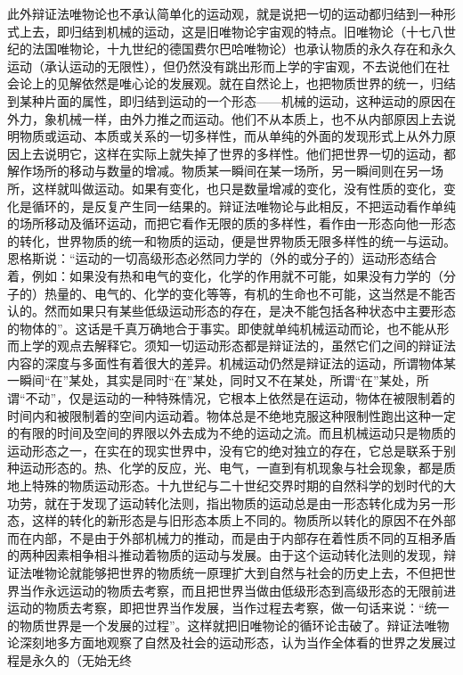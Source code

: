 此外辩证法唯物论也不承认简单化的运动观，就是说把一切的运动都归结到一种形式上去，即归结到机械的运动，这是旧唯物论宇宙观的特点。旧唯物论（十七八世纪的法国唯物论，十九世纪的德国费尔巴哈唯物论）也承认物质的永久存在和永久运动（承认运动的无限性），但仍然没有跳出形而上学的宇宙观，不去说他们在社会论上的见解依然是唯心论的发展观。就在自然论上，也把物质世界的统一，归结到某种片面的属性，即归结到运动的一个形态——机械的运动，这种运动的原因在外力，象机械一样，由外力推之而运动。他们不从本质上，也不从内部原因上去说明物质或运动、本质或关系的一切多样性，而从单纯的外面的发现形式上从外力原因上去说明它，这样在实际上就失掉了世界的多样性。他们把世界一切的运动，都解作场所的移动与数量的增减。物质某一瞬间在某一场所，另一瞬间则在另一场所，这样就叫做运动。如果有变化，也只是数量增减的变化，没有性质的变化，变化是循环的，是反复产生同一结果的。辩证法唯物论与此相反，不把运动看作单纯的场所移动及循环运动，而把它看作无限的质的多样性，看作由一形态向他一形态的转化，世界物质的统一和物质的运动，便是世界物质无限多样性的统一与运动。恩格斯说：“运动的一切高级形态必然同力学的（外的或分子的）运动形态结合着，例如：如果没有热和电气的变化，化学的作用就不可能，如果没有力学的（分子的）热量的、电气的、化学的变化等等，有机的生命也不可能，这当然是不能否认的。然而如果只有某些低级运动形态的存在，是决不能包括各种状态中主要形态的物体的”。这话是千真万确地合于事实。即使就单纯机械运动而论，也不能从形而上学的观点去解释它。须知一切运动形态都是辩证法的，虽然它们之间的辩证法内容的深度与多面性有着很大的差异。机械运动仍然是辩证法的运动，所谓物体某一瞬间“在”某处，其实是同时“在”某处，同时又不在某处，所谓“在”某处，所谓“不动”，仅是运动的一种特殊情况，它根本上依然是在运动，物体在被限制着的时间内和被限制着的空间内运动着。物体总是不绝地克服这种限制性跑出这种一定的有限的时间及空间的界限以外去成为不绝的运动之流。而且机械运动只是物质的运动形态之一，在实在的现实世界中，没有它的绝对独立的存在，它总是联系于别种运动形态的。热、化学的反应，光、电气，一直到有机现象与社会现象，都是质地上特殊的物质运动形态。十九世纪与二十世纪交界时期的自然科学的划时代的大功劳，就在于发现了运动转化法则，指出物质的运动总是由一形态转化成为另一形态，这样的转化的新形态是与旧形态本质上不同的。物质所以转化的原因不在外部而在内部，不是由于外部机械力的推动，而是由于内部存在着性质不同的互相矛盾的两种因素相争相斗推动着物质的运动与发展。由于这个运动转化法则的发现，辩证法唯物论就能够把世界的物质统一原理扩大到自然与社会的历史上去，不但把世界当作永远运动的物质去考察，而且把世界当做由低级形态到高级形态的无限前进运动的物质去考察，即把世界当作发展，当作过程去考察，做一句话来说：“统一的物质世界是一个发展的过程”。这样就把旧唯物论的循环论击破了。辩证法唯物论深刻地多方面地观察了自然及社会的运动形态，认为当作全体看的世界之发展过程是永久的（无始无终